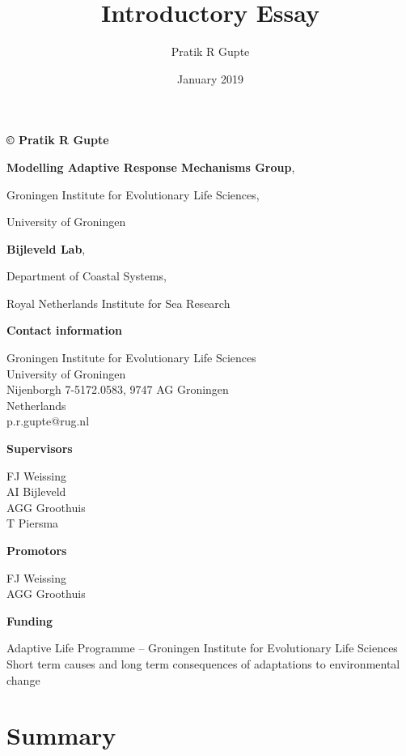 \documentclass[]{scrartcl}
\title{Introductory Essay}
\author{Pratik R Gupte}
\date{January 2019}
\begin{document}
\maketitle

\newpage

\textbf{© Pratik R Gupte}

\textbf{Modelling Adaptive Response Mechanisms Group},

Groningen Institute for Evolutionary Life Sciences,

University of Groningen

\textbf{Bijleveld Lab},

Department of Coastal Systems,

Royal Netherlands Institute for Sea Research

\textbf{Contact information}

Groningen Institute for Evolutionary Life Sciences\\
University of Groningen\\
Nijenborgh 7-5172.0583, 9747 AG Groningen \\
Netherlands\\
p.r.gupte@rug.nl

\textbf{Supervisors}

FJ Weissing\\
AI Bijleveld\\
AGG Groothuis\\
T Piersma

\textbf{Promotors}

FJ Weissing\\
AGG Groothuis

\textbf{Funding}

Adaptive Life Programme -- Groningen Institute for Evolutionary Life
Sciences\\
Short term causes and long term consequences of adaptations to
environmental change

\newpage

\tableofcontents

\newpage \mbox{} \pagebreak

\part*{Summary}\label{summary}
\end{document}
